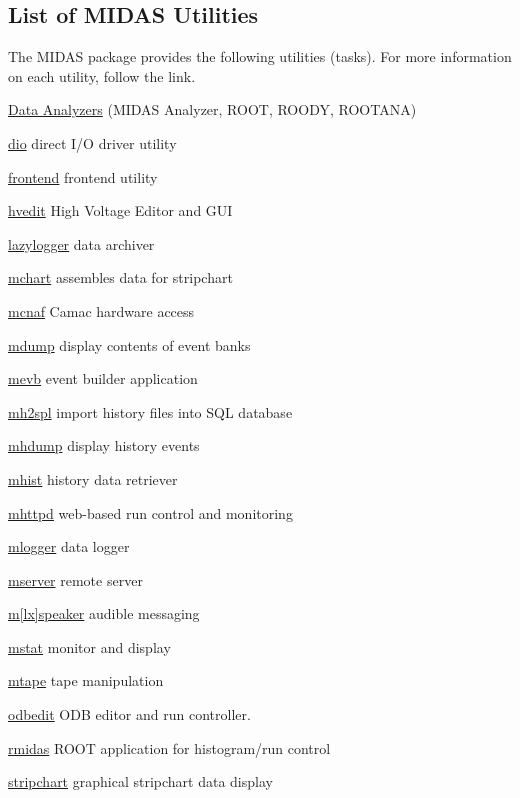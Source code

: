 \label{index_end}
\hypertarget{index_end}{}
  \subsection{List of MIDAS Utilities}\label{F_Utilities_List}
 \label{F_Utilities_List_idx_utilities_list-of-Midas-utilities}
\hypertarget{F_Utilities_List_idx_utilities_list-of-Midas-utilities}{}
 The MIDAS package provides the following utilities (tasks). For more information on each utility, follow the link.


\begin{DoxyItemize}
\item \hyperlink{DataAnalysis_DA_Data_analyzers}{Data Analyzers} (MIDAS Analyzer, ROOT, ROODY, ROOTANA)
\item \hyperlink{FE_utils_FE_dio_utility}{dio} direct I/O driver utility
\item \hyperlink{FrontendOperation_FE_frontend_utility}{frontend} frontend utility
\item \hyperlink{RC_Monitor_RC_hvedit_utility}{hvedit} High Voltage Editor and GUI
\item \hyperlink{F_LogUtil_F_lazylogger_utility}{lazylogger} data archiver
\item \hyperlink{F_LogUtil_F_mchart_utility}{mchart} assembles data for stripchart
\item \hyperlink{FE_utils_FE_mcnaf_utility}{mcnaf} Camac hardware access
\item \hyperlink{RC_Monitor_RC_mdump_utility}{mdump} display contents of event banks
\item \hyperlink{FE_Event_Builder_FE_mevb_utility}{mevb} event builder application
\item \hyperlink{F_History_logging_F_mh2sql_utility}{mh2spl} import history files into SQL database
\item \hyperlink{F_History_logging_F_mhdump_utility}{mhdump} display history events
\item \hyperlink{F_History_logging_F_mhist_utility}{mhist} history data retriever
\item \hyperlink{RC_mhttpd_utility}{mhttpd} web-\/based run control and monitoring
\item \hyperlink{F_Logging_F_mlogger_utility}{mlogger} data logger
\item \hyperlink{RC_customize_ODB_RC_mserver_utility}{mserver} remote server
\item \hyperlink{F_Messaging_F_mspeaker_utility}{m\mbox{[}lx\mbox{]}speaker} audible messaging
\item \hyperlink{RC_Monitor_RC_mstat_utility}{mstat} monitor and display
\item \hyperlink{F_LogUtil_F_mtape_utility}{mtape} tape manipulation
\item \hyperlink{RC_odbedit_utility}{odbedit} ODB editor and run controller.
\item \hyperlink{RC_Monitor_RC_rmidas_utility}{rmidas} ROOT application for histogram/run control
\item \hyperlink{F_LogUtil_F_stripchartfile}{stripchart} graphical stripchart data display
\end{DoxyItemize}

